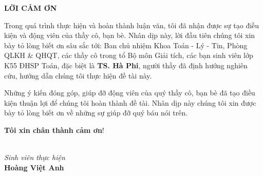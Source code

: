\centerline {\textbf{LỜI CẢM ƠN}}

Trong quá trình thực hiện và hoàn thành luận văn, tôi đã nhận được sự tạo điều kiện và động viên của thầy cô, bạn bè. Nhân dịp này, lời đầu tiên chúng tôi xin bày tỏ lòng biết ơn sâu sắc tới: Ban chủ nhiệm Khoa Toán - Lý - Tin, Phòng QLKH \& QHQT, các thầy cô trong tổ Bộ môn Giải tích, các bạn sinh viên lớp K55 ĐHSP Toán, đặc biệt là \textbf{TS. Hà Phi}, người thầy đã định hướng nghiên cứu, hướng dẫn chúng tôi thực hiện đề tài này.

Những ý kiến đóng góp, giúp đỡ động viên của quý thầy cô, bạn bè đã tạo điều kiện thuận lợi để chúng tôi hoàn thành đề tài. Nhân dịp này chúng tôi xin được bày tỏ lòng biết ơn về những sự giúp đỡ quý báu nói trên.  


 \textbf{Tôi xin chân thành cảm ơn}!


\hspace*{8.5cm}{\it Sơn La, tháng 5 năm 2017}\\
\hspace*{10cm} {\it Sinh viên thực hiện}\\
                 
\hspace*{10cm} {\bf Hoàng Việt Anh}

 \newpage
